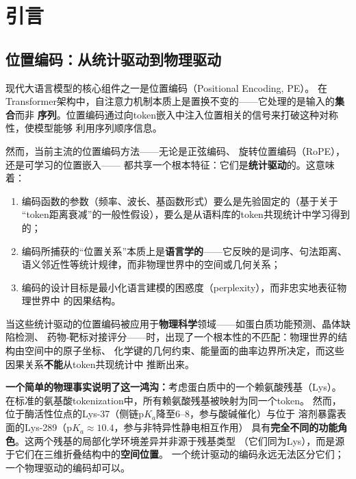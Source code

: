 \documentclass[11pt,a4paper]{article}
\theoremstyle{remark}
\begin{document}
\section{引言}

\subsection{位置编码：从统计驱动到物理驱动}

现代大语言模型的核心组件之一是位置编码（Positional Encoding, PE）。
在Transformer架构中，自注意力机制本质上是置换不变的——它处理的是输入的\textbf{集合}而非
\textbf{序列}。位置编码通过向token嵌入中注入位置相关的信号来打破这种对称性，使模型能够
利用序列顺序信息\cite{vaswani2017attention}。

然而，当前主流的位置编码方法——无论是正弦编码\cite{vaswani2017attention}、
旋转位置编码（RoPE）\cite{su2024roformer}，还是可学习的位置嵌入\cite{devlin2019bert}——
都共享一个根本特征：它们是\textbf{统计驱动}的。这意味着：

\begin{enumerate}[label=(\roman*)]
    \item 编码函数的参数（频率、波长、基函数形式）要么是先验固定的（基于关于
          ``token距离衰减''的一般性假设），要么是从语料库的token共现统计中学习得到的；
    \item 编码所捕获的``位置关系''本质上是\textbf{语言学的}——它反映的是词序、句法距离、
          语义邻近性等统计规律，而非物理世界中的空间或几何关系；
    \item 编码的设计目标是最小化语言建模的困惑度（perplexity），而非忠实地表征物理世界中
          的因果结构。
\end{enumerate}

当这些统计驱动的位置编码被应用于\textbf{物理科学}领域——如蛋白质功能预测、晶体缺陷检测、
药物-靶标对接评分——时，出现了一个根本性的不匹配：物理世界的结构由空间中的原子坐标、
化学键的几何约束、能量面的曲率边界所决定，而这些因果关系\textbf{不能}从token共现统计中
推断出来。

\textbf{一个简单的物理事实说明了这一鸿沟：}考虑蛋白质中的一个赖氨酸残基（Lys）。
在标准的氨基酸tokenization中，所有赖氨酸残基被映射为同一个token。
然而，位于酶活性位点的Lys-37（侧链$\text{p}K_a$降至6--8，参与酸碱催化）与位于
溶剂暴露表面的Lys-289（$\text{p}K_a \approx 10.4$，参与非特异性静电相互作用）
具有\textbf{完全不同的功能角色}。这两个残基的局部化学环境差异并非源于残基类型
（它们同为Lys），而是源于它们在三维折叠结构中的\textbf{空间位置}。
一个统计驱动的编码永远无法区分它们；一个物理驱动的编码却可以。
\end{document}
